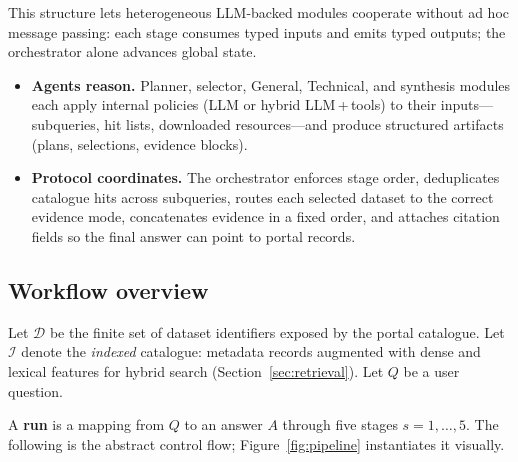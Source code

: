 \documentclass[sigconf,anonymous]{acmart}
\begin{document}
This structure lets heterogeneous LLM-backed modules cooperate without ad hoc message passing: each stage consumes typed inputs and emits typed outputs; the orchestrator alone advances global state.

\begin{itemize}
  \item \textbf{Agents reason.} Planner, selector, General, Technical, and synthesis modules each apply internal policies (LLM or hybrid LLM\,+\,tools) to their inputs---subqueries, hit lists, downloaded resources---and produce structured artifacts (plans, selections, evidence blocks).
  \item \textbf{Protocol coordinates.} The orchestrator enforces stage order, deduplicates catalogue hits across subqueries, routes each selected dataset to the correct evidence mode, concatenates evidence in a fixed order, and attaches citation fields so the final answer can point to portal records.
\end{itemize}

\subsection{Workflow overview}
\label{sec:protocol-workflow}

Let $\mathcal{D}$ be the finite set of dataset identifiers exposed by the portal catalogue. Let $\mathcal{I}$ denote the \emph{indexed} catalogue: metadata records augmented with dense and lexical features for hybrid search (Section~\ref{sec:retrieval}). Let $Q$ be a user question.

A \textbf{run} is a mapping from $Q$ to an answer $A$ through five stages $s=1,\ldots,5$. The following is the abstract control flow; Figure~\ref{fig:pipeline} instantiates it visually.
\end{document}
